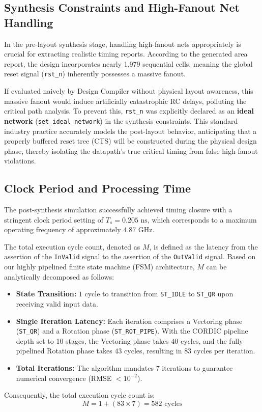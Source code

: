 \documentclass[11pt, a4paper]{article}
\begin{document}
\subsection{Synthesis Constraints and High-Fanout Net Handling}
In the pre-layout synthesis stage, handling high-fanout nets appropriately is crucial for extracting realistic timing reports. According to the generated area report, the design incorporates nearly 1,979 sequential cells, meaning the global reset signal (\texttt{rst_n}) inherently possesses a massive fanout. 

If evaluated naively by Design Compiler without physical layout awareness, this massive fanout would induce artificially catastrophic RC delays, polluting the critical path analysis. To prevent this, \texttt{rst_n} was explicitly declared as an \textbf{ideal network} (\texttt{set_ideal_network}) in the synthesis constraints. This standard industry practice accurately models the post-layout behavior, anticipating that a properly buffered reset tree (CTS) will be constructed during the physical design phase, thereby isolating the datapath's true critical timing from false high-fanout violations.

\subsection{Clock Period and Processing Time}
The post-synthesis simulation successfully achieved timing closure with a stringent clock period setting of $T_s = 0.205 \text{ ns}$, which corresponds to a maximum operating frequency of approximately $4.87 \text{ GHz}$. 

The total execution cycle count, denoted as $M$, is defined as the latency from the assertion of the \texttt{InValid} signal to the assertion of the \texttt{OutValid} signal. Based on our highly pipelined finite state machine (FSM) architecture, $M$ can be analytically decomposed as follows:
\begin{itemize}
    \item \textbf{State Transition:} $1$ cycle to transition from \texttt{ST_IDLE} to \texttt{ST_QR} upon receiving valid input data.
    \item \textbf{Single Iteration Latency:} Each iteration comprises a Vectoring phase (\texttt{ST_QR}) and a Rotation phase (\texttt{ST_ROT_PIPE}). With the CORDIC pipeline depth set to 10 stages, the Vectoring phase takes $40$ cycles, and the fully pipelined Rotation phase takes $43$ cycles, resulting in $83$ cycles per iteration.
    \item \textbf{Total Iterations:} The algorithm mandates $7$ iterations to guarantee numerical convergence (RMSE $< 10^{-2}$).
\end{itemize}
Consequently, the total execution cycle count is:
$$ M = 1 + (83 \times 7) = 582 \text{ cycles} $$
\end{document}
